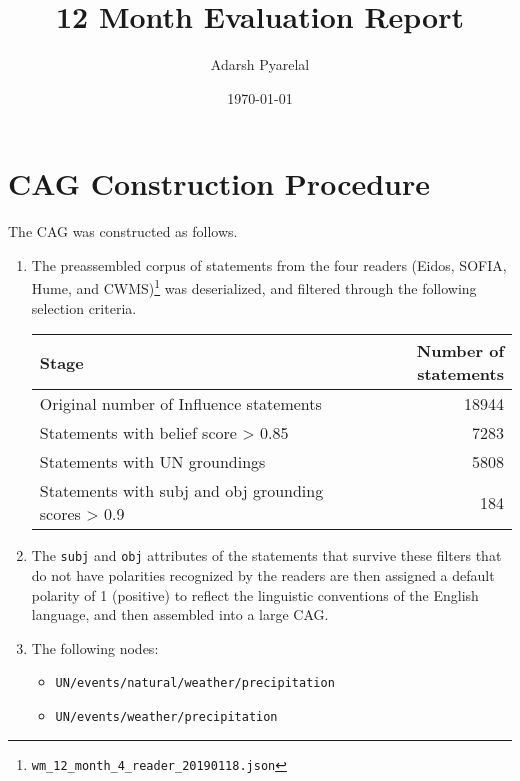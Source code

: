 \documentclass{apnotes}
\title{12 Month Evaluation Report}
\author{Adarsh Pyarelal}
\date{\today}
\begin{document}
\maketitle
\tableofcontents*

\bigskip
\bigskip


\chapter{CAG Construction Procedure}

The CAG was constructed as follows.

\begin{enumerate}

  \item The preassembled corpus of statements from the four readers (Eidos,
    SOFIA, Hume, and
    CWMS)\footnote{\texttt{wm\_12\_month\_4\_reader\_20190118.json}} was
    deserialized, and filtered through the following selection criteria.

\begin{center}
  \begin{tabular}{lr}
      \toprule
      Stage                                               & Number of statements\\
      \midrule
      Original number of Influence statements             & 18944\\
      Statements with belief score > 0.85                 & 7283\\
      Statements with UN groundings                       & 5808\\
      Statements with subj and obj grounding scores > 0.9 & 184\\
      \bottomrule
  \end{tabular}
\end{center}

\item The \texttt{subj} and \texttt{obj} attributes of the statements that
  survive these filters that do not have polarities recognized by the readers
  are then assigned a default polarity of 1 (positive) to reflect the linguistic
  conventions of the English language, and then assembled into a large CAG.

\item The following nodes:
  \begin{itemize}
    \item \texttt{UN/events/natural/weather/precipitation}
    \item \texttt{UN/events/weather/precipitation}
  \end{itemize}


\end{enumerate}
\end{document}
